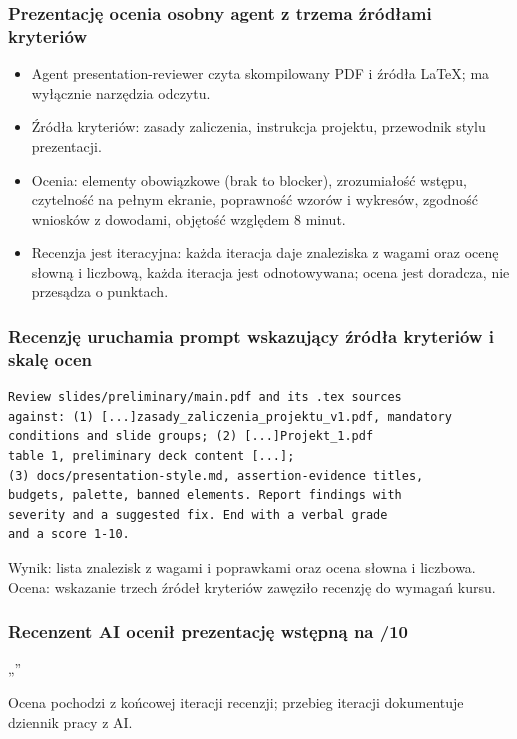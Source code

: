 

\begin{frame}
  \frametitle{Prezentację ocenia osobny agent z trzema źródłami kryteriów}
  \begin{itemize}
    \item Agent presentation-reviewer czyta skompilowany PDF i źródła LaTeX;
      ma wyłącznie narzędzia odczytu.
    \item Źródła kryteriów: zasady zaliczenia, instrukcja projektu, przewodnik
      stylu prezentacji.
    \item Ocenia: elementy obowiązkowe (brak to blocker), zrozumiałość
      wstępu, czytelność na pełnym ekranie, poprawność wzorów i wykresów,
      zgodność wniosków z dowodami, objętość względem 8 minut.
    \item Recenzja jest iteracyjna: każda iteracja daje znaleziska z wagami
      oraz ocenę słowną i liczbową, każda iteracja jest odnotowywana;
      ocena jest doradcza, nie przesądza o punktach.
  \end{itemize}
\end{frame}

\begin{frame}[fragile]
  \frametitle{Recenzję uruchamia prompt wskazujący źródła kryteriów i skalę ocen}
  {\footnotesize
\begin{verbatim}
Review slides/preliminary/main.pdf and its .tex sources
against: (1) [...]zasady_zaliczenia_projektu_v1.pdf, mandatory
conditions and slide groups; (2) [...]Projekt_1.pdf
table 1, preliminary deck content [...];
(3) docs/presentation-style.md, assertion-evidence titles,
budgets, palette, banned elements. Report findings with
severity and a suggested fix. End with a verbal grade
and a score 1-10.
\end{verbatim}}
  \vskip1mm
  Wynik: lista znalezisk z wagami i poprawkami oraz ocena słowna i liczbowa.\\
  Ocena: wskazanie trzech źródeł kryteriów zawęziło recenzję do wymagań kursu.
\end{frame}

\begin{frame}
  \frametitle{Recenzent AI ocenił prezentację wstępną na \resReviewScore{}/10}
  „\resReviewVerbal''
  \vskip3mm
  {\footnotesize\color{mnMuted}
    Ocena pochodzi z końcowej iteracji recenzji; przebieg iteracji
    dokumentuje dziennik pracy z AI.\par}
\end{frame}
